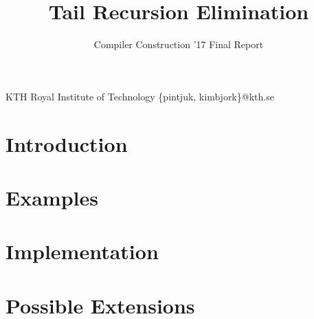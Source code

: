 \documentclass[nocopyrightspace,11pt,authoryear,preprint]{sigplanconf}
\begin{document}


\title{Tail Recursion Elimination}
\subtitle{Compiler Construction '17 Final Report}

           {KTH Royal Institute of Technology}
           {\{pintjuk, kimbjork\}@kth.se}

\maketitle

\section{Introduction}


\section{Examples}


\section{Implementation}


\section{Possible Extensions}




\end{document}
